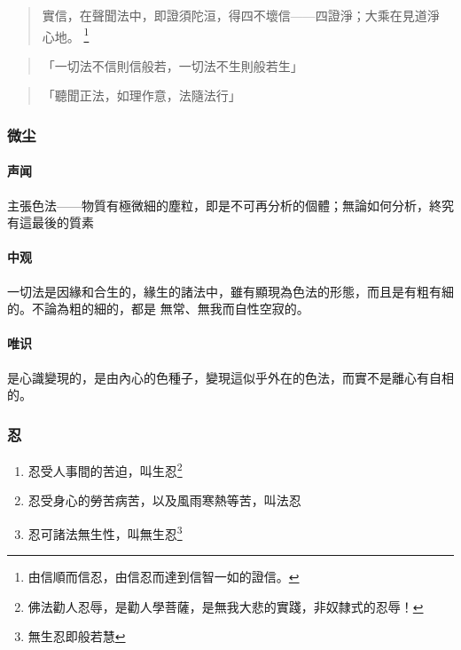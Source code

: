 \begin{quote}
  實信，在聲聞法中，即證須陀洹，得四不壞信——四證淨；大乘在見道淨 心地。
  \footnote{由信順而信忍，由信忍而達到信智一如的證信。}
\end{quote}

\begin{quote}
  「一切法不信則信般若，一切法不生則般若生」
\end{quote}

\begin{quote}
  「聽聞正法，如理作意，法隨法行」
\end{quote}

\subsubsection{微尘}
\paragraph{声闻}
主張色法——物質有極微細的塵粒，即是不可再分析的個體；無論如何分析，終究有這最後的質素
\paragraph{中观}
一切法是因緣和合生的，緣生的諸法中，雖有顯現為色法的形態，而且是有粗有細的。不論為粗的細的，都是 無常、無我而自性空寂的。
\paragraph{唯识}
是心識變現的，是由內心的色種子，變現這似乎外在的色法，而實不是離心有自相的。

\subsubsection{忍}
\begin{enumerate}
  \item 忍受人事間的苦迫，叫生忍\footnote{佛法勸人忍辱，是勸人學菩薩，是無我大悲的實踐，非奴隸式的忍辱！}
  \item 忍受身心的勞苦病苦，以及風雨寒熱等苦，叫法忍
  \item 忍可諸法無生性，叫無生忍\footnote{無生忍即般若慧}
\end{enumerate}
